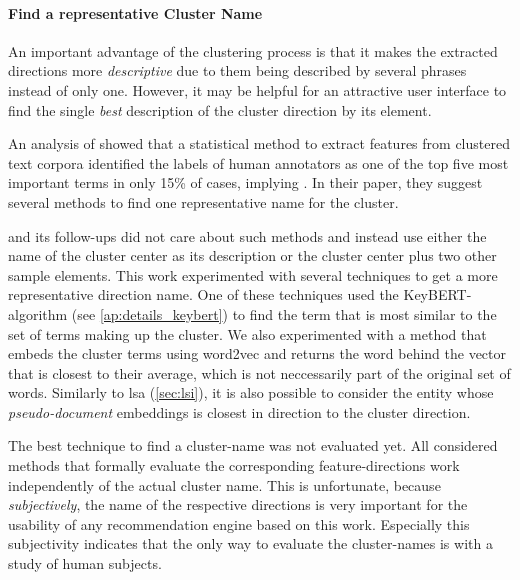 \paragraph{Find a representative Cluster Name}

An important advantage of the clustering process is that it makes the extracted directions more \textit{descriptive} due to them being described by several phrases instead of only one. However, it may be helpful for an attractive user interface to find the single \textit{best} description of the cluster direction by its element.

An analysis of \cite{Carmel2009} showed that a statistical method to extract features from clustered text corpora identified the labels of human annotators as one of the top five most important terms in only 15\% of cases, implying  \cite[139]{Carmel2009}. In their paper, they suggest several methods to find one representative name for the cluster. 

\textcite{Derrac2015} and its follow-ups \cite{Ager2018,Alshaikh2020} did not care about such methods and instead use either the name of the cluster center as its description or the cluster center plus two other sample elements. This work experimented with several techniques to get a more representative direction name. One of these techniques used the KeyBERT-algorithm (see \autoref{ap:details_keybert}) to find the term that is most similar to the set of terms making up the cluster. We also experimented with a method that embeds the cluster terms using \gls{word2vec} and returns  the word behind the vector that is closest to their average, which is not neccessarily part of the original set of words. Similarly to \gls{lsa} (\autoref{sec:lsi}), it is also possible to consider the entity whose \textit{pseudo-document} embeddings is closest in direction to the cluster direction.

The best technique to find a cluster-name was not evaluated yet. All considered methods that formally evaluate the corresponding feature-directions work independently of the actual cluster name. This is unfortunate, because \textit{subjectively}, the name of the respective directions is very important for the usability of any recommendation engine based on this work. Especially this subjectivity indicates that the only way to evaluate the cluster-names is with a study of human subjects.

\vspace{-0.5ex}
